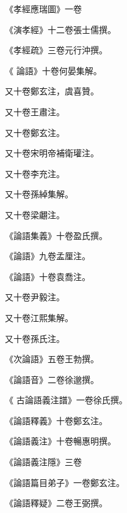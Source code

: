 \begin{pinyinscope}
 《孝經應瑞圖》一卷



 《演孝經》十二卷張士儒撰。



 《孝經疏》三卷元行沖撰。



 《
 論語》十卷何晏集解。



 又十卷鄭玄注，虞喜贊。



 又十卷王肅注。



 又十卷鄭玄注。



 又十卷宋明帝補衛瓘注。



 又十卷李充注。



 又十卷孫綽集解。



 又十卷梁翽注。



 《論語集義》十卷盈氏撰。



 《論語》九卷孟厘注。



 《論語》十卷袁喬注。



 又十卷尹毅注。



 又十卷江熙集解。



 又十卷孫氏注。



 《次論語》五卷王勃撰。



 《論語音》二卷徐邈撰。



 《
 古論語義注譜》一卷徐氏撰。



 《論語釋義》十卷鄭玄注。



 《論語義注》十卷暢惠明撰。



 《論語義注隱》三卷



 《論語篇目弟子》一卷鄭玄注。



 《論語釋疑》二卷王弼撰。




\end{pinyinscope}

